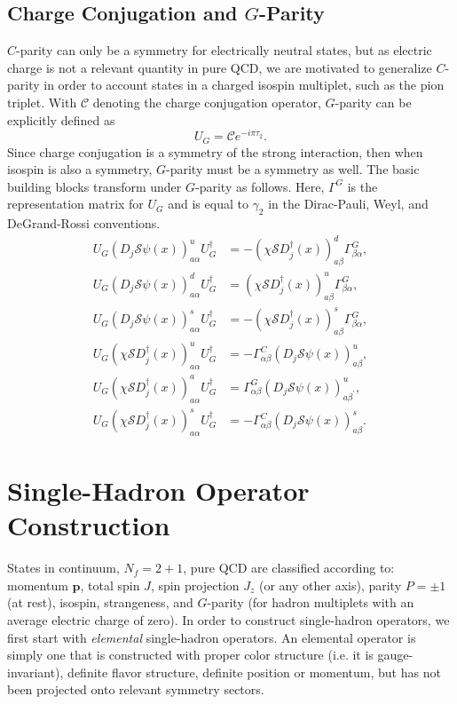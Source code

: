     \subsection{Charge Conjugation and $G$-Parity}
    $C$-parity can only be a symmetry for electrically neutral states, but as electric charge is not a relevant quantity in pure QCD, we are motivated to generalize $C$-parity in order to account states in a charged isospin multiplet, such as the pion triplet. With $\mathcal C$ denoting the charge conjugation operator, $G$-parity can be explicitly defined as
    \begin{equation}
        U_G = \mathcal C e^{-i\pi\tau_2}.
    \end{equation}
    Since charge conjugation is a symmetry of the strong interaction, then when isospin is also a symmetry, $G$-parity must be a symmetry as well. The basic building blocks transform under $G$-parity as follows. Here, $\Gamma^G$ is the representation matrix for $U_G$ and is equal to $\gamma_2$ in the Dirac-Pauli, Weyl, and DeGrand-Rossi conventions.
    \begin{align} U_{G}\left(D_{j} \mathcal S \psi(x)\right)_{a \alpha}^{u} U_{G}^{\dagger} &=-\left(\chi \mathcal S D_{j}^{\dagger}(x)\right)_{a \beta}^{d} \Gamma_{\beta \alpha}^{G}, \\ U_{G}\left(D_{j}\mathcal S \psi(x)\right)_{a \alpha}^{d} U_{G}^{\dagger} &=\left(\chi \mathcal S D_{j}^{\dagger}(x)\right)_{a \beta}^{u} \Gamma_{\beta \alpha}^{G}, \\ U_{G}\left(D_{j} \mathcal S \psi(x)\right)_{a \alpha}^{s} U_{G}^{\dagger} &=-\left(\chi \mathcal S D_{j}^{\dagger}(x)\right)_{a \beta}^{s} \Gamma_{\beta \alpha}^{G}, \\ U_{G}\left(\chi \mathcal S D_{j}^{\dagger}(x)\right)_{a \alpha}^{u} U_{G}^{\dagger} &=-\Gamma_{\alpha \beta}^{C}\left(D_{j} \mathcal S \psi(x)\right)_{a \beta}^{u}, \\ U_{G}\left(\chi \mathcal S D_{j}^{\dagger}(x)\right)_{a \alpha}^{a} U_{G}^{\dagger} &=\Gamma_{\alpha \beta}^{G}\left(D_{j} \mathcal S \psi(x)\right)_{a \beta^{\prime}}^{u}, \\ U_{G}\left(\chi \mathcal S D_{j}^{\dagger}(x)\right)_{a \alpha}^{s} U_{G}^{\dagger} &=-\Gamma_{\alpha \beta}^{C}\left(D_{j} \mathcal S \psi(x)\right)_{a \beta}^{s}. \end{align}
    \section{Single-Hadron Operator Construction}
    States in continuum, $N_f=2+1$, pure QCD are classified according to: momentum $\boldsymbol p$, total spin $J$, spin projection $J_z$ (or any other axis), parity $P = \pm 1$ (at rest), isospin, strangeness, and $G$-parity (for hadron multiplets with an average electric charge of zero). In order to construct single-hadron operators, we first start with \emph{elemental} single-hadron operators. An elemental operator is simply one that is constructed with proper color structure (i.e. it is gauge-invariant), definite flavor structure, definite position or momentum, but has not been projected onto relevant symmetry sectors.
